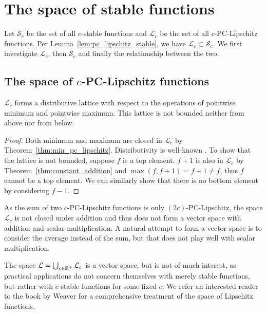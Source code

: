 \chapter{The space of stable functions}
\label{chap:space}


Let $\mathcal{S}_c$ be the set of all $c$-stable functions
and $\mathcal{L}_c$ be the set of all $c$-PC-Lipschitz functions.
Per Lemma~\ref{lem:pc_lipschitz_stable}, we have $\mathcal{L}_c \subset \mathcal{S}_c$.
We first investigate $\mathcal{L}_c$, then $\mathcal{S}_c$ and finally the relationship between the two.

\section{The space of $c$-PC-Lipschitz functions}
\label{sec:space_pc_lipschitz}

\begin{theorem}
    $\mathcal{L}_c$ forms a distributive lattice with respect to the operations
    of pointwise minimum and pointwise maximum. This lattice is not bounded
    neither from above nor from below.
\end{theorem}
\begin{proof}
    Both minimum and maximum are closed in $\mathcal{L}_c$ by
    Theorem~\ref{thm:min_pc_lipschitz}.
    Distributivity is well-known .
    To show that the lattice is not bounded, suppose $f$ is a top element.
    $f + 1$ is also in $\mathcal{L}_c$ by Theorem~\ref{thm:constant_addition}
    and $\max(f, f + 1) = f + 1 \neq f$, thus $f$ cannot be a top element.
    We can similarly show that there is no bottom element
    by considering $f - 1$.
\end{proof}

As the sum of two $c$-PC-Lipschitz functions is only $(2c)$-PC-Lipschitz,
the space $\mathcal{L}_c$ is not closed under addition and thus does not form a
vector space with addition and scalar multiplication.
A natural attempt to form a vector space is to consider the average instead of
the sum, but that does not play well with scalar multiplication.

The space $\mathcal{L} = \bigcup_{c \in \mathbb{R}^+} \mathcal{L}_c$ is a vector space,
but is not of much interest, as practical applications do not concern themselves
with merely stable functions, but rather with $c$-stable functions for some
fixed $c$. We refer an interested reader to the book by Weaver
\cite{weaver2018lipschitz} for a comprehensive treatment of the space of
Lipschitz functions.

